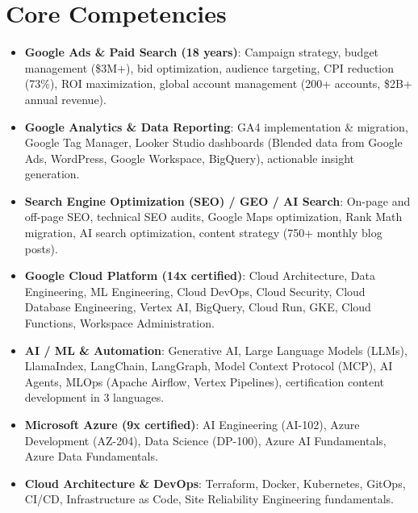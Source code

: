 \documentclass[11pt,a4paper,sans]{moderncv}
\begin{document}
\section{Core Competencies}
\vspace{1pt}
\begin{itemize}

\item \textbf{Google Ads \& Paid Search (18 years)}: Campaign strategy, budget management (\$3M+), bid optimization, audience targeting, CPI reduction (73\%), ROI maximization, global account management (200+ accounts, \$2B+ annual revenue).

\item \textbf{Google Analytics \& Data Reporting}: GA4 implementation \& migration, Google Tag Manager, Looker Studio dashboards (Blended data from Google Ads, WordPress, Google Workspace, BigQuery), actionable insight generation.

\item \textbf{Search Engine Optimization (SEO) / GEO / AI Search}: On-page and off-page SEO, technical SEO audits, Google Maps optimization, Rank Math migration, AI search optimization, content strategy (750+ monthly blog posts).

\item \textbf{Google Cloud Platform (14x certified)}: Cloud Architecture, Data Engineering, ML Engineering, Cloud DevOps, Cloud Security, Cloud Database Engineering, Vertex AI, BigQuery, Cloud Run, GKE, Cloud Functions, Workspace Administration.

\item \textbf{AI / ML \& Automation}: Generative AI, Large Language Models (LLMs), LlamaIndex, LangChain, LangGraph, Model Context Protocol (MCP), AI Agents, MLOps (Apache Airflow, Vertex Pipelines), certification content development in 3 languages.

\item \textbf{Microsoft Azure (9x certified)}: AI Engineering (AI-102), Azure Development (AZ-204), Data Science (DP-100), Azure AI Fundamentals, Azure Data Fundamentals.

\item \textbf{Cloud Architecture \& DevOps}: Terraform, Docker, Kubernetes, GitOps, CI/CD, Infrastructure as Code, Site Reliability Engineering fundamentals.

\end{itemize}

\end{document}
